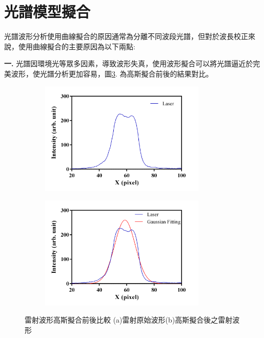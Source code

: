 \section{光譜模型擬合}
光譜波形分析使用曲線擬合\cite{Spectral-fitting}的原因通常為分離不同波段光譜，但對於波長校正來說，使用曲線擬合的主要原因為以下兩點:
\par
	\textbf{一.} 光譜因環境光等眾多因素，導致波形失真，使用波形擬合可以將光譜逼近於完美波形，使光譜分析更加容易，圖\ref{雷射波形高斯擬合前後}. 為高斯擬合前後的結果對比。
	\begin{figure}[H]
		\centering
		\vspace{0.8cm}
		\begin{subfigure}[fig nice]{0.49\textwidth}
			\setlength{\abovecaptionskip}{0.cm}
			\includegraphics[width=7.9cm]{figures/Laser1.png}
			\caption{}
			\label{雷射波形}
		\end{subfigure}
		\begin{subfigure}[fig nice]{0.49\textwidth}
			\setlength{\abovecaptionskip}{0.cm}
			\includegraphics[width=7.9cm]{figures/Gassian_NEW600.png}
			\caption{}
			\label{雷射經高斯擬合後}
		\end{subfigure}
	\caption[失真嚴重的雷射波形高斯擬合前後比較圖]{雷射波形高斯擬合前後比較 (a)雷射原始波形(b)高斯擬合後之雷射波形}
	\label{雷射波形高斯擬合前後}
	\end{figure}
